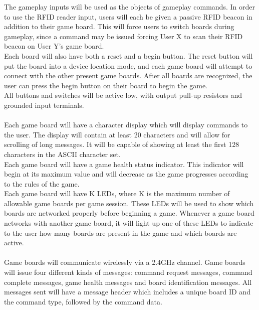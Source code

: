 \documentclass[aps,letterpaper,10pt]{revtex4}
\begin{document}
The gameplay inputs will be used as the objects of gameplay commands. In order to use the RFID reader input, users will each be given a passive RFID beacon in addition to their game board. This will force users to switch boards during gameplay, since a command may be issued forcing User X to scan their RFID beacon on User Y's game board. \\

Each board will also have both a reset and a begin button. The reset button will put the board into a device location mode, and each game board will attempt to connect with the other present game boards. After all boards are recognized, the user can press the begin button on their board to begin the game. \\

All buttons and switches will be active low, with output pull-up resistors and grounded input terminals. \\

\\

Each game board will have a character display which will display commands to the user. The display will contain at least 20 characters and will allow for scrolling of long messages. It will be capable of showing at least the first 128 characters in the ASCII character set. \\

Each game board will have a game health status indicator. This indicator will begin at its maximum value and will decrease as the game progresses according to the rules of the game. \\

Each game board will have K LEDs, where K is the maximum number of allowable game boards per game session. These LEDs will be used to show which boards are networked properly before beginning a game. Whenever a game board networks with another game board, it will light up one of these LEDs to indicate to the user how many boards are present in the game and which boards are active. \\


\\

Game boards will communicate wirelessly via a 2.4GHz channel. Game boards will issue four different kinds of messages: command request messages,  command complete messages, game health messages and board identification messages. All messages sent will have a message header which includes a unique board ID and the command type, followed by the command data.\\
\end{document}
